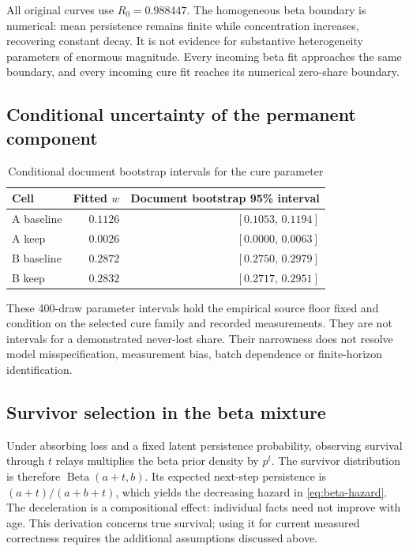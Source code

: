 \documentclass[10pt,letterpaper]{amsart}
\numberwithin{equation}{section}
\begin{document}
All original curves use $R_0=0.988447$. The homogeneous beta boundary is numerical: mean
persistence remains finite while concentration increases, recovering constant decay. It is
not evidence for substantive heterogeneity parameters of enormous magnitude. Every
incoming beta fit approaches the same boundary, and every incoming cure fit reaches its
numerical zero-share boundary.

\subsection*{Conditional uncertainty of the permanent component}

\begin{table}[!htbp]
  \centering
  \small
  \caption{Conditional document bootstrap intervals for the cure parameter}
  \label{tab:cure-intervals}
  \begin{tabular}{@{}lrr@{}}
    \toprule
    \textbf{Cell} & \textbf{Fitted $w$} & \textbf{Document bootstrap 95\% interval} \\
    \midrule
    A baseline & $0.1126$ & $[0.1053,\,0.1194]$ \\
    A keep & $0.0026$ & $[0.0000,\,0.0063]$ \\
    B baseline & $0.2872$ & $[0.2750,\,0.2979]$ \\
    B keep & $0.2832$ & $[0.2717,\,0.2951]$ \\
    \bottomrule
  \end{tabular}
\end{table}

These 400-draw parameter intervals hold the empirical source floor fixed and condition on
the selected cure family and recorded measurements. They are not intervals for a
demonstrated never-lost share. Their narrowness does not resolve model misspecification,
measurement bias, batch dependence or finite-horizon identification.

\subsection*{Survivor selection in the beta mixture}

Under absorbing loss and a fixed latent persistence probability, observing survival
through $t$ relays multiplies the beta prior density by $p^t$. The survivor distribution
is therefore $\operatorname{Beta}(a+t,b)$. Its expected next-step persistence is
$(a+t)/(a+b+t)$, which yields the decreasing hazard in \eqref{eq:beta-hazard}. The
deceleration is a compositional effect: individual facts need not improve with age. This
derivation concerns true survival; using it for current measured correctness requires the
additional assumptions discussed above.
\end{document}
